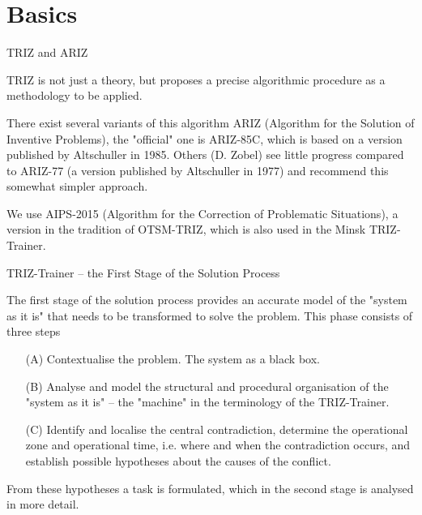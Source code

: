 \documentclass{beamer}
\title{Modelling Sustainable Systems\\ and Semantic Web\\[6pt]
  About the Notion of a Technical System
  \vskip1em}
\subtitle{Lecture in the Module 10-202-2309\\ for Master Computer Science}
\author{Prof. Dr. Hans-Gert Gräbe\\
\url{http://www.informatik.uni-leipzig.de/~graebe}}
\date{April 2021}
\begin{document}
\section{Basics}
\begin{frame}{TRIZ and ARIZ}

TRIZ is not just a theory, but proposes a precise algorithmic procedure as a
methodology to be applied.

There exist several variants of this algorithm ARIZ (Algorithm for the
Solution of Inventive Problems), the "official" one is ARIZ-85C, which is
based on a version published by Altschuller in 1985. Others (D. Zobel) see
little progress compared to ARIZ-77 (a version published by Altschuller in
1977) and recommend this somewhat simpler approach.

We use AIPS-2015 (Algorithm for the Correction of Problematic Situations), a
version in the tradition of OTSM-TRIZ, which is also used in the Minsk
TRIZ-Trainer.
\end{frame}

\begin{frame}{TRIZ-Trainer -- the First Stage of the Solution Process}
  
The first stage of the solution process provides an accurate model of the
"system as it is" that needs to be transformed to solve the problem. This
phase consists of three steps
\begin{itemize}
\item [(A)] Contextualise the problem. The system as a black box.
\item [(B)] Analyse and model the structural and procedural organisation of
  the "system as it is" -- the "machine" in the terminology of the
  TRIZ-Trainer.
\item [(C)] Identify and localise the central contradiction, determine the
  operational zone and operational time, i.e. where and when the contradiction
  occurs, and establish possible hypotheses about the causes of the conflict.
\end{itemize}
From these hypotheses a task is formulated, which in the second stage is
analysed in more detail.
\end{frame}
\end{document}
